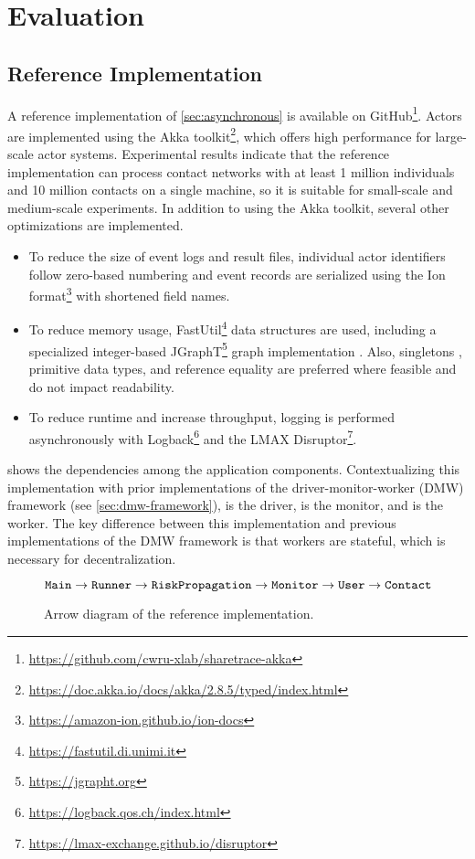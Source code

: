 \chapter{Evaluation}\label{ch:evaluation}

\section{Reference Implementation}

A reference implementation of \cref{sec:asynchronous} is available on GitHub\footnote{\url{https://github.com/cwru-xlab/sharetrace-akka}}. Actors are implemented using the Akka toolkit\footnote{\url{https://doc.akka.io/docs/akka/2.8.5/typed/index.html}}, which offers high performance for large-scale actor systems. Experimental results indicate that the reference implementation can process contact networks with at least 1 million individuals and 10 million contacts on a single machine, so it is suitable for small-scale and medium-scale experiments. In addition to using the Akka toolkit, several other optimizations are implemented.
\begin{itemize}
  \item To reduce the size of event logs and result files, individual actor identifiers follow zero-based numbering and event records are serialized using the Ion format\footnote{\url{https://amazon-ion.github.io/ion-docs}} with shortened field names.
  \item To reduce memory usage, FastUtil\footnote{\url{https://fastutil.di.unimi.it}} data structures are used, including a specialized integer-based JGraphT\footnote{\url{https://jgrapht.org}} graph implementation \citep{Michail2020}. Also, singletons \citep{Gamma1995}, primitive data types, and reference equality are preferred where feasible and do not impact readability.
  \item To reduce runtime and increase throughput, logging is performed asynchronously with Logback\footnote{\url{https://logback.qos.ch/index.html}} and the LMAX Disruptor\footnote{\url{https://lmax-exchange.github.io/disruptor}}.
\end{itemize}

 shows the dependencies among the application components. Contextualizing this implementation with prior implementations of the driver-monitor-worker (DMW) framework (see \cref{sec:dmw-framework}),  is the driver,  is the monitor, and  is the worker. The key difference between this implementation and previous implementations of the DMW framework is that workers are stateful, which is necessary for decentralization.
\begin{figure}[htbp]
\begin{equation*}
  \texttt{Main} \rightarrow \texttt{Runner} \rightarrow \texttt{RiskPropagation} \rightarrow \texttt{Monitor} \rightarrow \texttt{User} \rightarrow \texttt{Contact}
\end{equation*}
\caption[Arrow diagram of the reference implementation]{Arrow diagram of the reference implementation.}
\label{fig:arrow-diagram}
\end{figure}

